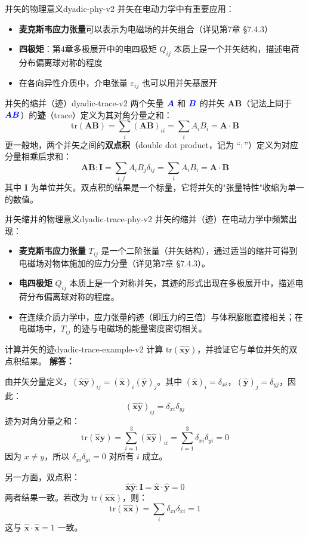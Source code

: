 \documentclass[11pt,a4paper,openany,oneside]{book}
\newcommand{\vecB}{\textcolor{blue}{\vect{B}}}
\newcommand{\vecA}{\textcolor{blue!70!black}{\vect{A}}}
\newcommand{\vect}[1]{\bm{#1}}
\newcommand{\unitvec}[1]{\hat{\vect{#1}}}
\newcommand{\difficulty}[1]{\marginnote{\textcolor{red}{\textbf{[#1]}}}}
\begin{document}
\begin{insight}{并矢的物理意义}{dyadic-phy-v2}
并矢在电动力学中有重要应用：
\begin{itemize}
\item \textbf{麦克斯韦应力张量}可以表示为电磁场的并矢组合（详见第7章 §7.4.3）
\item \textbf{四极矩}：第4章多极展开中的电四极矩 $Q_{ij}$ 本质上是一个并矢结构，描述电荷分布偏离球对称的程度
\item 在各向异性介质中，介电张量 $\varepsilon_{ij}$ 也可以用并矢基展开
\end{itemize}
\end{insight}

\begin{definition}{并矢的缩并（迹）}{dyadic-trace-v2}
两个矢量 $\vecA$ 和 $\vecB$ 的并矢 $\bm{A}\bm{B}$（记法上同于 $\vecA\vecB$）的\textbf{迹}（trace）定义为其对角分量之和：
\[
\text{tr}(\bm{A}\bm{B}) = \sum_i (\bm{A}\bm{B})_{ii} = \sum_i A_i B_i = \bm{A}\cdot\bm{B}
\]
更一般地，两个并矢之间的\textbf{双点积}（double dot product，记为 ``$:$''）定义为对应分量相乘后求和：
\[
\bm{A}\bm{B} : \bm{I} = \sum_{i,j} A_i B_j \delta_{ij} = \sum_i A_i B_i = \bm{A}\cdot\bm{B}
\]
其中 $\bm{I}$ 为单位并矢。双点积的结果是一个标量，它将并矢的"张量特性"收缩为单一的数值。
\end{definition}

\begin{insight}{并矢缩并的物理意义}{dyadic-trace-phy-v2}
并矢的缩并（迹）在电动力学中频繁出现：
\begin{itemize}
\item \textbf{麦克斯韦应力张量} $T_{ij}$ 是一个二阶张量（并矢结构），通过适当的缩并可得到电磁场对物体施加的应力分量（详见第7章 §7.4.3）。
\item \textbf{电四极矩} $Q_{ij}$ 本质上是一个对称并矢，其迹的形式出现在多极展开中，描述电荷分布偏离球对称的程度。
\item 在连续介质力学中，应力张量的迹（即压力的三倍）与体积膨胀直接相关；在电磁场中，$T_{ij}$ 的迹与电磁场的能量密度密切相关。
\end{itemize}
\end{insight}

\begin{example}{计算并矢的迹}{dyadic-trace-example-v2}
\difficulty{基础}
计算 $\text{tr}(\unitvec{x}\unitvec{y})$，并验证它与单位并矢的双点积结果。
\tcblower
\textbf{解答：}

由并矢分量定义，$(\unitvec{x}\unitvec{y})_{ij} = (\unitvec{x})_i (\unitvec{y})_j$。其中 $(\unitvec{x})_i = \delta_{xi}$，$(\unitvec{y})_j = \delta_{yj}$，因此：
\[
(\unitvec{x}\unitvec{y})_{ij} = \delta_{xi} \delta_{yj}
\]
迹为对角分量之和：
\[
\text{tr}(\unitvec{x}\unitvec{y}) = \sum_{i=1}^{3} (\unitvec{x}\unitvec{y})_{ii} = \sum_{i=1}^{3} \delta_{xi} \delta_{yi} = 0
\]
因为 $x \neq y$，所以 $\delta_{xi}\delta_{yi} = 0$ 对所有 $i$ 成立。

另一方面，双点积：
\[
\unitvec{x}\unitvec{y} : \bm{I} = \unitvec{x}\cdot\unitvec{y} = 0
\]
两者结果一致。若改为 $\text{tr}(\unitvec{x}\unitvec{x})$，则：
\[
\text{tr}(\unitvec{x}\unitvec{x}) = \sum_i \delta_{xi}\delta_{xi} = 1
\]
这与 $\unitvec{x}\cdot\unitvec{x} = 1$ 一致。
\end{example}
\end{document}
